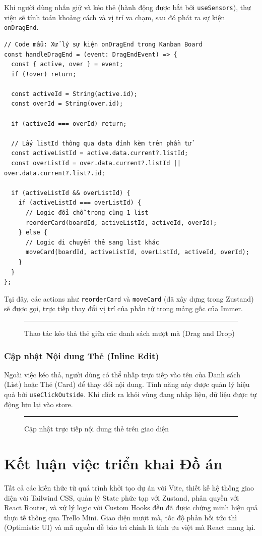 Khi người dùng nhấn giữ và kéo thẻ (hành động được bắt bởi \texttt{useSensors}), thư viện sẽ tính toán khoảng cách và vị trí va chạm, sau đó phát ra sự kiện \texttt{onDragEnd}.

\begin{Verbatim}
// Code mẫu: Xử lý sự kiện onDragEnd trong Kanban Board
const handleDragEnd = (event: DragEndEvent) => {
  const { active, over } = event;
  if (!over) return;

  const activeId = String(active.id);
  const overId = String(over.id);

  if (activeId === overId) return;

  // Lấy listId thông qua data đính kèm trên phần tử
  const activeListId = active.data.current?.listId;
  const overListId = over.data.current?.listId || over.data.current?.list?.id;

  if (activeListId && overListId) {
    if (activeListId === overListId) {
      // Logic đổi chỗ trong cùng 1 list
      reorderCard(boardId, activeListId, activeId, overId);
    } else {
      // Logic di chuyển thẻ sang list khác
      moveCard(boardId, activeListId, overListId, activeId, overId);
    }
  }
};
\end{Verbatim}

Tại đây, các actions như \texttt{reorderCard} và \texttt{moveCard} (đã xây dựng trong Zustand) sẽ được gọi, trực tiếp thay đổi vị trí của phần tử trong mảng gốc của Immer.

\begin{figure}[H]
    \centering
    \rule{0.8\textwidth}{0.5\textwidth}
    \caption{Thao tác kéo thả thẻ giữa các danh sách mượt mà (Drag and Drop)}
\end{figure}

\subsection{Cập nhật Nội dung Thẻ (Inline Edit)}
Ngoài việc kéo thả, người dùng có thể nhấp trực tiếp vào tên của Danh sách (List) hoặc Thẻ (Card) để thay đổi nội dung. Tính năng này được quản lý hiệu quả bởi \texttt{useClickOutside}. Khi click ra khỏi vùng đang nhập liệu, dữ liệu được tự động lưu lại vào store.

\begin{figure}[H]
    \centering
    \rule{0.6\textwidth}{0.3\textwidth}
    \caption{Cập nhật trực tiếp nội dung thẻ trên giao diện}
\end{figure}

\chapter{Kết luận việc triển khai Đồ án}
Tất cả các kiến thức từ quá trình khởi tạo dự án với Vite, thiết kế hệ thống giao diện với Tailwind CSS, quản lý State phức tạp với Zustand, phân quyền với React Router, và xử lý logic với Custom Hooks đều đã được chứng minh hiệu quả thực tế thông qua Trello Mini. Giao diện mượt mà, tốc độ phản hồi tức thì (Optimistic UI) và mã nguồn dễ bảo trì chính là tính ưu việt mà React mang lại.

